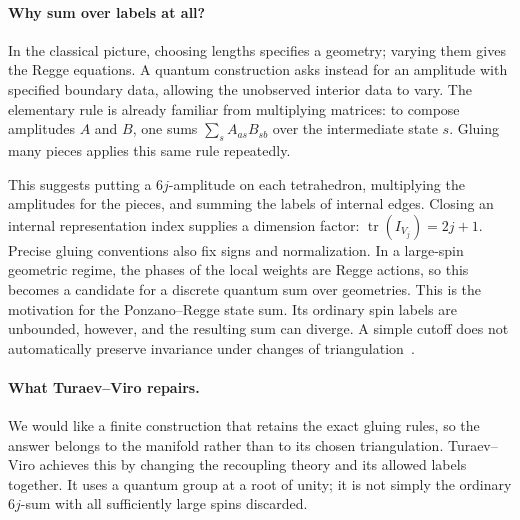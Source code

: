 \paragraph{Why sum over labels at all?}
In the classical picture, choosing lengths specifies a geometry;
varying them gives the Regge equations. A quantum construction asks
instead for an amplitude with specified boundary data, allowing the
unobserved interior data to vary. The elementary rule is already
familiar from multiplying matrices: to compose amplitudes $A$ and
$B$, one sums $\sum_s A_{as}B_{sb}$ over the intermediate state $s$.
Gluing many pieces applies this same rule repeatedly.

This suggests putting a $6j$-amplitude on each tetrahedron,
multiplying the amplitudes for the pieces, and summing the labels
of internal edges. Closing an internal representation index supplies
a dimension factor: $\operatorname{tr}(I_{V_j})=2j+1$.
Precise gluing conventions also fix signs and normalization.
In a large-spin geometric regime, the phases of the local weights
are Regge actions, so this becomes a candidate for a discrete
quantum sum over geometries. This is the motivation for the
Ponzano--Regge state sum. Its ordinary spin labels are unbounded,
however, and the resulting sum can diverge. A simple cutoff does
not automatically preserve invariance under changes of
triangulation~\cite[Sections 2.1--2.4]{BarrettNaishGuzman}.

\paragraph{What Turaev--Viro repairs.}
We would like a finite construction that retains the exact gluing
rules, so the answer belongs to the manifold rather than to its
chosen triangulation. Turaev--Viro achieves this by changing the
recoupling theory and its allowed labels together. It uses a
quantum group at a root of unity; it is not simply the ordinary
$6j$-sum with all sufficiently large spins discarded.

